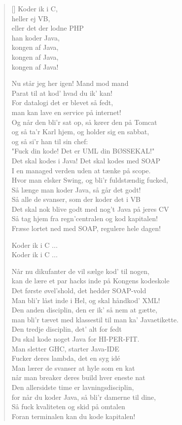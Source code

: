 \begin{multicols}{2}
\begin{verse}[\versewidth]
Koder ik i C,\\
heller ej VB,\\
eller det der lodne PHP\\
han koder Java,\\
kongen af Java,\\
kongen af Java,\\
kongen af Java!

Nu står jeg her igen! Mand mod mand\\
Parat til at kod' hvad du ik' kan!\\
For datalogi det er blevet så fedt,\\
man kan lave en service på internet!\\
Og når den bli'r sat op, så kører den på Tomcat\\
og så ta'r Karl hjem, og holder sig en sabbat,\\
og så si'r han til sin chef:\\
"Fuck din kode! Det er UML din BØSSEKAL!"\\
Det skal kodes i Java! Det skal kodes med SOAP\\
I en managed verden uden at tænke på scope.\\
Hvor man elsker Swing, og bli'r fuldstændig fucked,\\
Så længe man koder Java, så går det godt!\\
Så alle de svanser, som der koder det i VB\\
Det skal nok blive godt med nog't Java på jeres CV\\
Så tag hjem fra regn'centralen og kod kapitalen!\\
Fræse lortet ned med SOAP, regulere hele dagen!

Koder ik i C ...\\
Koder ik i C ...

Når nu dikufanter de vil sælge kod' til nogen,\\
kan de lære et par hacks inde på Kongens kodeskole\\
Det første øvel'shold, det hedder SOAP-vold\\
Man bli'r låst inde i Hel, og skal håndkod' XML!\\
Den anden disciplin, den er ik' så nem at gætte,\\
man bli'r tævet med klassestil til man ka' Javaetikette.\\
Den tredje disciplin, det' alt for fedt\\
Du skal kode noget Java for HI-PER-FIT.\\
Man sletter GHC, starter Java-IDE\\
Fucker deres lambda, det en syg idé\\
Man lærer de svanser at hyle som en kat\\
når man breaker deres build hver eneste nat\\
Den allersidste time er lavningsdisciplin,\\
for når du koder Java, så bli'r damerne til dine,\\
Så fuck kvaliteten og skid på omtalen\\
Foran terminalen kan du kode kapitalen!


\end{verse}
\end{multicols}
